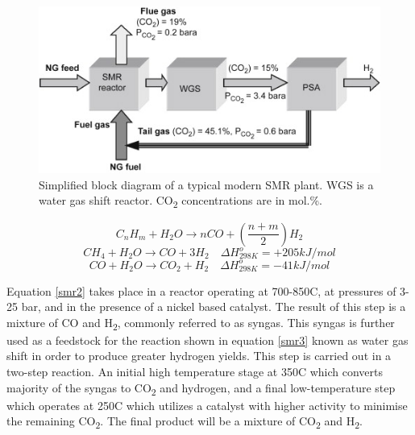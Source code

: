 \begin{figure}
    \centering
    \includegraphics{figures/smrprocess.jpg}
    \caption{Simplified block diagram of a typical modern SMR plant. WGS is a water gas shift reactor. CO\textsubscript{2} concentrations are in mol.\%. \cite{Muradov2015}}
    \label{fig:smrprocess}
\end{figure}

\begin{equation} \label{smr1}
    C_n H_m + H_2 O \rightarrow nCO +(\frac{n+m}{2})H_2 
\end{equation}
\begin{equation}\label{smr2}
    CH_4 + H_2 O \rightarrow CO + 3H_2 \quad \Delta H_{298K}^o = +205 kJ/mol
\end{equation}
\begin{equation}\label{smr3}
    CO+ H_2 O \rightarrow CO_2 + H_2 \quad \Delta H_{298K}^o = -41 kJ/mol
\end{equation}

Equation \ref{smr2} takes place in a reactor operating at 700-850\textdegree C, at pressures of 3-25 bar, and in the presence of a nickel based catalyst. \cite{Muradov2015}
The result of this step is a mixture of CO and H\textsubscript{2}, commonly referred to as syngas. 
This syngas is further used as a feedstock for the reaction shown in equation \ref{smr3} known as water gas 
shift in order to produce greater hydrogen yields.  
This step is carried out in a two-step reaction. An initial high temperature stage at 350\textdegree C which converts majority of the syngas to CO\textsubscript{2} and hydrogen, and a final low-temperature step which operates at 250\textdegree C which utilizes a catalyst with higher activity to minimise the remaining CO\textsubscript{2}. \cite{Muradov2015}
The final product will be a mixture of CO\textsubscript{2} and H\textsubscript{2}.  

